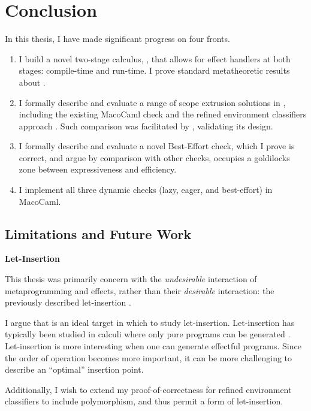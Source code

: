 \chapter{Conclusion}

In this thesis, I have made significant progress on four fronts. 

\begin{enumerate}
\item I build a novel two-stage calculus, \calculusName{}, that allows for effect handlers at both stages: compile-time and run-time. I prove standard metatheoretic results about \calculusName{}.

\item I formally describe and evaluate a range of scope extrusion solutions in \calculusName{}, including the existing MacoCaml check \citep{kiselyov-14} and the refined environment classifiers approach \citep{kiselyov-16}. Such comparison was facilitated by \calculusName{}, validating its design.

\item I formally describe and evaluate a novel Best-Effort check, which I prove is correct, and argue by comparison with other checks, occupies a goldilocks zone between expressiveness and efficiency.

\item I implement all three dynamic checks (lazy, eager, and best-effort) in MacoCaml. 
\end{enumerate}

\section{Limitations and Future Work}
\begin{minipage}[t]{0.25\textwidth}
  \textbf{\textsf{Let-Insertion}}
\end{minipage}%
\begin{minipage}[t]{0.75\textwidth}
  This thesis was primarily concern with the \textit{undesirable} interaction of metaprogramming and effects, rather than their \textit{desirable} interaction: the previously described let-insertion \citep{yallop-2019}. 
  \vspace{2mm}

  I argue that \calculusName{} is an ideal target in which to study let-insertion. Let-insertion has typically been studied in calculi where only pure programs can be generated \citep{isoda-24}. Let-insertion is more interesting when one can generate effectful programs. Since the order of operation becomes more important, it can be more challenging to describe an ``optimal'' insertion point.
  \vspace{2mm}

  Additionally, I wish to extend my proof-of-correctness for refined environment classifiers to include polymorphism, and thus permit a form of let-insertion. 
  \vspace{4mm}
\end{minipage}\\


